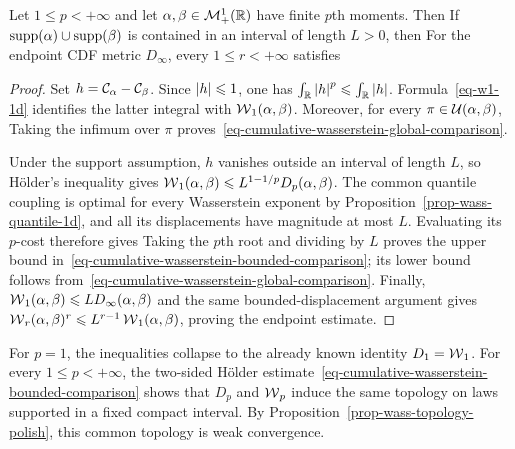 \begin{prop}\label{prop-cumulative-wasserstein-comparison}
	Let $1\leq p<+\infty$ and let $\alpha,\beta\in\mathcal{M}_+^1(\mathbb{R})$ have finite $p$th moments. Then
	If $\operatorname{supp}(\alpha)\cup\operatorname{supp}(\beta)$ is contained in an interval of length $L>0$, then
	For the endpoint CDF metric $D_\infty$, every $1\leq r<+\infty$ satisfies
\end{prop}
\begin{proof}
	Set $h=\mathcal{C}_{\alpha}-\mathcal{C}_{\beta}$. Since $\left\lvert h\right\rvert\leqslant1$, one has $\int_{\mathbb{R}}\left\lvert h\right\rvert^p\leqslant\int_{\mathbb{R}}\left\lvert h\right\rvert$. Formula~\eqref{eq-w1-1d} identifies the latter integral with $\operatorname{\mathcal{W}}_1(\alpha,\beta)$. Moreover, for every $\pi\in\mathcal{U}(\alpha,\beta)$,
	Taking the infimum over $\pi$ proves~\eqref{eq-cumulative-wasserstein-global-comparison}.

	Under the support assumption, $h$ vanishes outside an interval of length $L$, so H\"older's inequality gives
	$\operatorname{\mathcal{W}}_1(\alpha,\beta)\leqslant L^{1-1/p}D_p(\alpha,\beta)$. The common quantile coupling is optimal for every Wasserstein exponent by Proposition~\ref{prop-wass-quantile-1d}, and all its displacements have magnitude at most $L$. Evaluating its $p$-cost therefore gives
	Taking the $p$th root and dividing by $L$ proves the upper bound in~\eqref{eq-cumulative-wasserstein-bounded-comparison}; its lower bound follows from~\eqref{eq-cumulative-wasserstein-global-comparison}. Finally, $\operatorname{\mathcal{W}}_1(\alpha,\beta)\leqslant L D_\infty(\alpha,\beta)$ and the same bounded-displacement argument gives $\operatorname{\mathcal{W}}_r(\alpha,\beta)^r\leqslant L^{r-1}\operatorname{\mathcal{W}}_1(\alpha,\beta)$, proving the endpoint estimate.
\end{proof}

For $p=1$, the inequalities collapse to the already known identity $D_1=\operatorname{\mathcal{W}}_1$. For every $1\leq p<+\infty$, the two-sided H\"older estimate~\eqref{eq-cumulative-wasserstein-bounded-comparison} shows that $D_p$ and $\operatorname{\mathcal{W}}_p$ induce the same topology on laws supported in a fixed compact interval. By Proposition~\ref{prop-wass-topology-polish}, this common topology is weak convergence.

